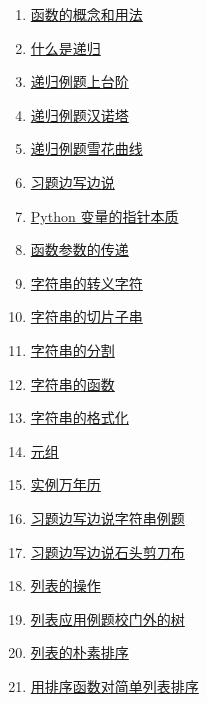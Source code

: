 \documentclass[11pt]{article}
\begin{document}
\begin{multicols}{2}
\begin{enumerate}
		\item  \href{https://mp.weixin.qq.com/s/ARe4a-hE3VWyWBbiZbXgCQ}{函数的概念和用法} %
		\item  \href{https://mp.weixin.qq.com/s/17Ki447UDQ_igAzR2Ba_AQ}{什么是递归} %
		\item  \href{https://mp.weixin.qq.com/s/uYucDbZ3cjrgsge8k_tFBw}{递归例题上台阶} %
		\item  \href{https://mp.weixin.qq.com/s/ZbE-RydanPPesEqJWeOfYg}{递归例题汉诺塔} %
		\item  \href{https://mp.weixin.qq.com/s/kJ_RVQ7yY2qrbZoAiCZiZw}{递归例题雪花曲线} %
		\item  \href{https://mp.weixin.qq.com/s/fjzPuCS8s5y4a46mkl5T1A}{习题边写边说} %
		\item  \href{https://mp.weixin.qq.com/s/s-0VDKMlAfCIYn0esgoOIw}{Python 变量的指针本质} %
		\item  \href{https://mp.weixin.qq.com/s/GwnyXxAmj04_hOtwQmmM5A}{函数参数的传递} %
		\item  \href{https://mp.weixin.qq.com/s/cEZPep-2-bnA0aSTzWKyYg}{字符串的转义字符} %
		\item  \href{https://mp.weixin.qq.com/s/2FbOWWTALmCtzPuppr5fcw}{字符串的切片子串} %
		\item  \href{https://mp.weixin.qq.com/s/iuvBI9eL0edH0sIRjkoTqw}{字符串的分割} %
		\item  \href{https://mp.weixin.qq.com/s/_wnMIzvF4OHL4ACvciqjkg}{字符串的函数} %
		\item  \href{https://mp.weixin.qq.com/s/dRCYWsIq1q0IoJ11PwFIXQ}{字符串的格式化} %
		\item  \href{https://mp.weixin.qq.com/s/b3uDzOZ7i7VHuOqfCLKKyA}{元组} %
		\item  \href{https://mp.weixin.qq.com/s/La4IeovPHeANCO9SqMGKwQ}{实例万年历} %
		\item  \href{https://mp.weixin.qq.com/s/djmQZNjzwF6RrhHg-hXOiw}{习题边写边说字符串例题} %
		\item  \href{https://mp.weixin.qq.com/s/oEeZ992RGVywLApqxXMVZg}{习题边写边说石头剪刀布} %
		\item  \href{https://mp.weixin.qq.com/s/1L1NOcu3wqbdiW4Z8iBJwA}{列表的操作} %
		\item  \href{https://mp.weixin.qq.com/s/CJeyNvLQok7i_0CpdLGQcA}{列表应用例题校门外的树} %
		\item  \href{https://mp.weixin.qq.com/s/xp4-UjanRaMwm-IOGFa-Og}{列表的朴素排序} %
		\item  \href{https://mp.weixin.qq.com/s/kM1aOdIgC9d7q6N7bqczfA}{用排序函数对简单列表排序} %

\end{enumerate}
\end{multicols}
\end{document}
